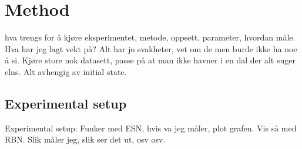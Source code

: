 \section{Method}

hva trengs for å kjøre eksperimentet, metode, oppsett, parameter, hvordan måle.
Hva har jeg lagt vekt på? Alt har jo svakheter, vet om de men burde ikke ha noe å si.
Kjøre store nok datasett, passe på at man ikke havner i en dal der alt suger elns.
Alt avhengig av initial state.

\subsection{Experimental setup}

Experimental setup: Funker med ESN, hvis va jeg måler, plot grafen.
Vis så med RBN. Slik måler jeg, slik ser det ut, osv osv.
